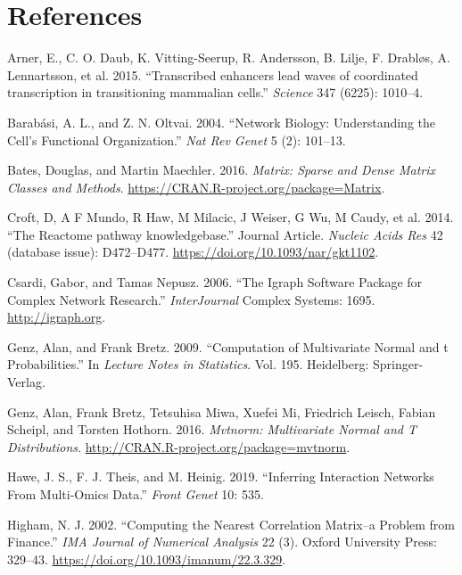 \documentclass[]{article}
\begin{document}
\hypertarget{references}{%
\section*{References}\label{references}}

\hypertarget{refs}{}
\leavevmode\hypertarget{ref-Arner2015}{}%
Arner, E., C. O. Daub, K. Vitting-Seerup, R. Andersson, B. Lilje, F.
Drabløs, A. Lennartsson, et al. 2015. ``Transcribed enhancers lead waves
of coordinated transcription in transitioning mammalian cells.''
\emph{Science} 347 (6225): 1010--4.

\leavevmode\hypertarget{ref-Barabasi2004}{}%
Barabási, A. L., and Z. N. Oltvai. 2004. ``Network Biology:
Understanding the Cell's Functional Organization.'' \emph{Nat Rev Genet}
5 (2): 101--13.

\leavevmode\hypertarget{ref-Matrix}{}%
Bates, Douglas, and Martin Maechler. 2016. \emph{Matrix: Sparse and
Dense Matrix Classes and Methods}.
\url{https://CRAN.R-project.org/package=Matrix}.

\leavevmode\hypertarget{ref-Reactome}{}%
Croft, D, A F Mundo, R Haw, M Milacic, J Weiser, G Wu, M Caudy, et al.
2014. ``The Reactome pathway knowledgebase.'' Journal Article.
\emph{Nucleic Acids Res} 42 (database issue): D472--D477.
\url{https://doi.org/10.1093/nar/gkt1102}.

\leavevmode\hypertarget{ref-igraph}{}%
Csardi, Gabor, and Tamas Nepusz. 2006. ``The Igraph Software Package for
Complex Network Research.'' \emph{InterJournal} Complex Systems: 1695.
\url{http://igraph.org}.

\leavevmode\hypertarget{ref-Genz2009}{}%
Genz, Alan, and Frank Bretz. 2009. ``Computation of Multivariate Normal
and t Probabilities.'' In \emph{Lecture Notes in Statistics}. Vol. 195.
Heidelberg: Springer-Verlag.

\leavevmode\hypertarget{ref-mvtnorm}{}%
Genz, Alan, Frank Bretz, Tetsuhisa Miwa, Xuefei Mi, Friedrich Leisch,
Fabian Scheipl, and Torsten Hothorn. 2016. \emph{Mvtnorm: Multivariate
Normal and T Distributions}.
\url{http://CRAN.R-project.org/package=mvtnorm}.

\leavevmode\hypertarget{ref-Hawe2019}{}%
Hawe, J. S., F. J. Theis, and M. Heinig. 2019. ``Inferring Interaction
Networks From Multi-Omics Data.'' \emph{Front Genet} 10: 535.

\leavevmode\hypertarget{ref-Higham2002}{}%
Higham, N. J. 2002. ``Computing the Nearest Correlation Matrix--a
Problem from Finance.'' \emph{IMA Journal of Numerical Analysis} 22 (3).
Oxford University Press: 329--43.
\url{https://doi.org/10.1093/imanum/22.3.329}.
\end{document}
